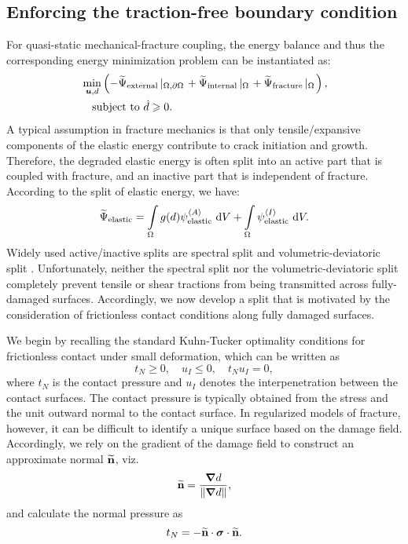 \subsection{Enforcing the traction-free boundary condition}
For quasi-static mechanical-fracture coupling, the energy balance and thus the corresponding energy minimization problem can be instantiated as:
\begin{equation}
  \begin{aligned}
     & \min_{\boldsymbol{u},d} \left( -\widetilde{\Psi}_{\text{external}} \left\vert_{\Omega,{\partial \Omega}}\right. + \widetilde{\Psi}_{\text{internal}} \left\vert_{\Omega}\right. + \widetilde{\Psi}_{\text{fracture}} \left\vert_{\Omega}\right. \right) , \\
     & \quad \text{subject to } \Dot{d} \geqslant 0.
  \end{aligned}
\end{equation}
A typical assumption in fracture mechanics is that only tensile/expansive components of the elastic energy contribute to crack initiation and growth. Therefore, the degraded elastic energy is often split into an active part that is coupled with fracture, and an inactive part that is independent of fracture. According to the split of elastic energy, we have:
\begin{align}
  \widetilde{\Psi}_{\text{elastic}} = \int\limits_\Omega g(d)\psi_{\text{elastic}}^{\left< A \right>} \text{ d}V + \int\limits_\Omega \psi_{\text{elastic}}^{\left< I \right>} \text{ d}V .
\end{align}
Widely used active/inactive splits are spectral split \cite{miehe_2010_p1, miehe_2010_p2} and volumetric-deviatoric split \cite{amor_2009}.  Unfortunately, neither the spectral split nor the volumetric-deviatoric split completely prevent tensile or shear tractions from being transmitted across fully-damaged surfaces.  Accordingly, we now develop a split that is motivated by the consideration of frictionless contact conditions along fully damaged surfaces.

We begin by recalling the standard Kuhn-Tucker optimality conditions for frictionless contact under small deformation, which can be written as
\begin{equation}
  t_N \geqslant 0, \quad u_I \leqslant 0, \quad t_N u_I = 0,
\end{equation}
where $t_N$ is the contact pressure and $u_I$ denotes the interpenetration between the contact surfaces.  The contact pressure is typically obtained from the stress and the unit outward normal to the contact surface.  In regularized models of fracture, however, it can be difficult to identify a unique surface based on the damage field.  Accordingly, we rely on the gradient of the damage field to construct an approximate normal $\widetilde{\textbf{n}}$, viz.
\begin{equation}
  \widetilde{\textbf{n}} = \frac{\boldsymbol{\nabla} d}{ \left\lVert\boldsymbol{\nabla} d\right\rVert },
\end{equation}
and calculate the normal pressure as
\begin{equation}
  \label{eq: pressure}
  t_N = -\widetilde{\textbf{n}}\cdot\boldsymbol{\sigma}\cdot\widetilde{\textbf{n}}.
\end{equation}

